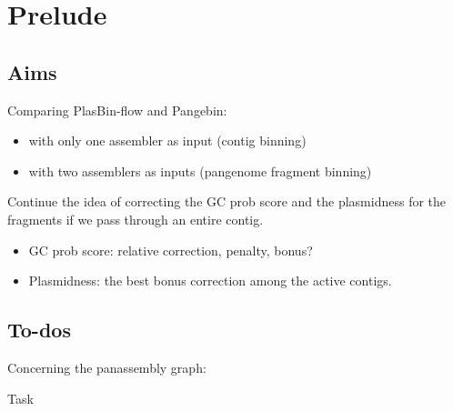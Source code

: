 \section*{Prelude}\label{sec:prelude}

\subsection*{Aims}\label{sec:prelude:aims}

\begin{description}[style=nextline]
  \item[Benchmarking]
    Comparing PlasBin-flow and Pangebin:
    \begin{itemize}
      \item with only one assembler as input (contig binning)
      \item with two assemblers as inputs (pangenome fragment binning)
    \end{itemize}
  \item[Binning panassembly graphs]
    Continue the idea of correcting the GC prob score and the plasmidness for the fragments if we pass through an entire contig.
    \begin{itemize}
      \item GC prob score: relative correction, penalty, bonus?
      \item Plasmidness: the best bonus correction among the active contigs.
    \end{itemize}
\end{description}

\subsection*{To-dos}\label{sec:prelude:to-dos}

\begin{todobox}
  Concerning the panassembly graph:
  \begin{CheckList}{Task}
  \end{CheckList}
\end{todobox}
